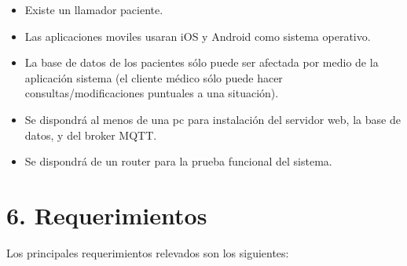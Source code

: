 \documentclass[
11pt, %
]{charter}
\begin{document}
\begin{itemize}
	\item Existe un llamador paciente. 
	\item Las aplicaciones moviles usaran iOS y Android como sistema operativo.
	\item La base de datos de los pacientes sólo puede ser afectada por medio de la aplicación sistema (el cliente médico sólo puede hacer consultas/modificaciones puntuales a una situación).	
	\item Se dispondrá al menos de una pc para instalación del servidor web, la base de datos, y del broker MQTT.
	\item Se dispondrá de un router para la prueba funcional del sistema. 

\end{itemize}






\section{6. Requerimientos}
\label{sec:requerimientos}
Los principales requerimientos relevados son los siguientes:
\end{document}
